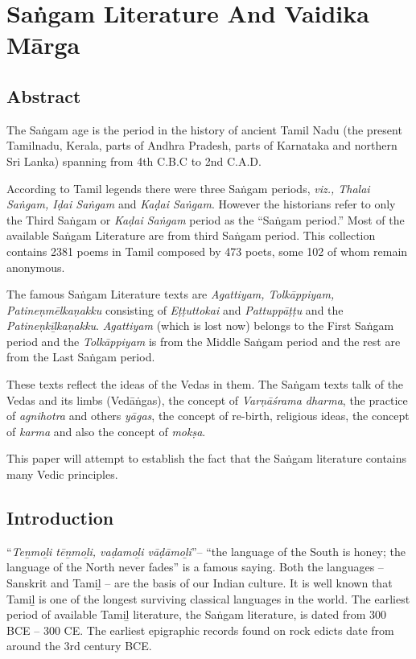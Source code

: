 
\chapter{Saṅgam Literature And Vaidika Mārga}



\section*{Abstract}

The Saṅgam age is the period in the history of ancient Tamil Nadu (the present Tamilnadu, Kerala, parts of Andhra Pradesh, parts of Karnataka and northern Sri Lanka) spanning from 4th C.B.C to 2nd C.A.D.

According to Tamil legends there were three Saṅgam periods, \textit{viz., Thalai Saṅgam, Iḍai Saṅgam} and \textit{Kaḍai Saṅgam}. However the historians refer to only the Third Saṅgam or \textit{Kaḍai Saṅgam} period as the “Saṅgam period.” Most of the available Saṅgam Literature are from third Saṅgam period. This collection contains 2381 poems in Tamil composed by 473 poets, some 102 of whom remain anonymous.

The famous Saṅgam Literature texts are \textit{Agattiyam, Tolkāppiyam, Patineṇmēlkaṇakku} consisting of \textit{Eṭṭuttokai} and \textit{Pattuppāṭṭu} and the \textit{Patineṇkīḻkaṇakku}. \textit{Agattiyam} (which is lost now) belongs to the First Saṅgam period and the \textit{Tolkāppiyam} is from the Middle Saṅgam period and the rest are from the Last Saṅgam period.

These texts reflect the ideas of the Vedas in them. The Saṅgam texts talk of the Vedas and its limbs (Vedāṅgas), the concept of \textit{Varṇāśrama dharma}, the practice of \textit{agnihotra} and others \textit{yāgas}, the concept of re-birth, religious ideas, the concept of \textit{karma} and also the concept of \textit{mokṣa}.

This paper will attempt to establish the fact that the Saṅgam literature contains many Vedic principles.


\section*{Introduction}

“\textit{Teṉmoḻi tēṉmoḻi, vaḍamoḻi vāḍāmoḻi}”– “the language of the South is honey; the language of the North never fades” is a famous saying. Both the languages – Sanskrit and Tamiḻ – are the basis of our Indian culture. It is well known that Tamiḻ is one of the longest surviving classical languages in the world. The earliest period of available Tamiḻ literature, the Saṅgam literature, is dated from 300 BCE – 300 CE. The earliest epigraphic records found on rock edicts date from around the 3rd century BCE.

